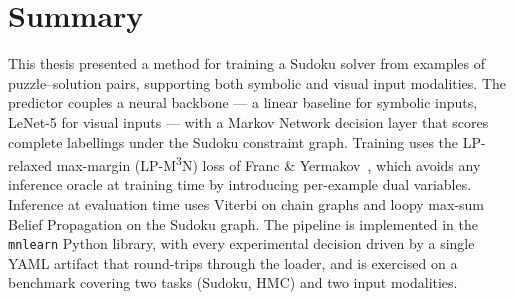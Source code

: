 \section{Summary}
\label{sec:conclusion-summary}

This thesis presented a method for training a Sudoku solver
from examples of puzzle--solution pairs, supporting both
symbolic and visual input modalities. The predictor couples a
neural backbone --- a linear baseline for symbolic inputs,
LeNet-5 for visual inputs --- with a Markov Network decision
layer that scores complete labellings under the Sudoku
constraint graph. Training uses the LP-relaxed max-margin
(LP-M\textsuperscript{3}N) loss of
Franc \& Yermakov~\cite{franc2021}, which avoids any inference
oracle at training time by introducing per-example dual
variables. Inference at evaluation time uses Viterbi on chain
graphs and loopy max-sum Belief Propagation on the Sudoku
graph. The pipeline is implemented in the \texttt{mnlearn}
Python library, with every experimental decision driven by a
single YAML artifact that round-trips through the loader, and
is exercised on a benchmark covering two tasks (Sudoku, HMC)
and two input modalities.
